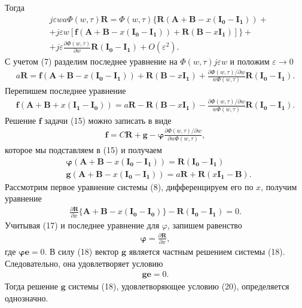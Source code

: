 Тогда
\begin{align*}
	&j\varepsilon wa\Phi(w,\tau)\boldsymbol{R}=\Phi(w,\tau)\{\boldsymbol{R} (\boldsymbol{A}+\boldsymbol{B}-x(\boldsymbol{I_{0}}-\boldsymbol{I_{1}}))+\\
	&+j\varepsilon w[\boldsymbol{f}(\boldsymbol{A}+\boldsymbol{B}-x(\boldsymbol{I_{0}}-\boldsymbol{I_{1}}))+
	\boldsymbol{R}(\boldsymbol{B}-x\boldsymbol{I_{1}})]\}+\\
	&+j\varepsilon \frac{\partial \Phi(w,\tau)}{\partial w}\boldsymbol{R}(\boldsymbol{I_{0}}-\boldsymbol{I_{1}})+O(\varepsilon^2).
\end{align*}
С учетом (7) разделим последнее уравнение на $\Phi (w, \tau)j\varepsilon w$ и положим $\varepsilon \rightarrow 0$
\begin{align*}
	a\boldsymbol{R}=\boldsymbol{f}(\boldsymbol{A}+\boldsymbol{B}-x(\boldsymbol{I_{0}}-\boldsymbol{I_{1}}))+\boldsymbol{R}(\boldsymbol{B}-x \boldsymbol{I_{1}})+ \frac{\partial \Phi(w,\tau)/\partial w}{w\Phi(w,\tau)}\boldsymbol{R}(\boldsymbol{I_{0}}-\boldsymbol{I_{1}}).
\end{align*}
Перепишем последнее уравнение
\begin{align}
	\boldsymbol{f}(\boldsymbol{A}+\boldsymbol{B}+x(\boldsymbol{I_{1}}-\boldsymbol{I_{0}}))= a\boldsymbol{R} -\boldsymbol{R}(\boldsymbol{B}-x\boldsymbol{I_{1}}) -\frac{\partial \Phi(w,\tau)/\partial w}{w\Phi(w,\tau)}\boldsymbol{R}(\boldsymbol{I_{0}}-\boldsymbol{I_{1}}).
\end{align}
Решение $\boldsymbol{f}$ задачи (15) можно записать в виде
\begin{align}
	\boldsymbol{f}=C\boldsymbol{R}+\boldsymbol{g}-\boldsymbol{\varphi} \frac{\partial \Phi(w,\tau)/\partial w}{\partial w\Phi(w,\tau)},
\end{align}
которое мы подставляем в (15) и получаем
\begin{align}
	&\boldsymbol{\varphi}(\boldsymbol{A}+\boldsymbol{B}-x(\boldsymbol{I_{0}}-\boldsymbol{I_{1}}))=\boldsymbol{R}(\boldsymbol{I_{0}}-\boldsymbol{I_{1}})\\
	&\boldsymbol{g}(\boldsymbol{A}+\boldsymbol{B}-x(\boldsymbol{I_{0}}-\boldsymbol{I_{1}}))=a\boldsymbol{R} +\boldsymbol{R}(x\boldsymbol{I_{1}}-\boldsymbol{B}).
\end{align}
Рассмотрим первое уравнение системы (8), дифференцируем его по $x$, получим уравнение
\begin{align*}
	\frac{\partial \boldsymbol{R}}{\partial x}\{\boldsymbol{A}+\boldsymbol{B}-x(\boldsymbol{I_{0}}-\boldsymbol{I_{0}})\} -\boldsymbol{R}(\boldsymbol{I_{0}}-\boldsymbol{I_{1}})=0.
\end{align*}
Учитывая (17) и последнее уравнение для $\varphi$, запишем равенство
\begin{align}
	\boldsymbol{\varphi}=\frac{\partial \boldsymbol{R}}{\partial x},
\end{align}
где $\boldsymbol{\varphi e}=0.$
В силу (18) вектор $\boldsymbol{g}$ является частным решением системы (18). Следовательно, она удовлетворяет условию\\
\begin{align}
\boldsymbol{ge}= 0.
\end{align}
Тогда решение $\boldsymbol{g}$ системы (18), удовлетворяющее условию
(20), определяется однозначно.

